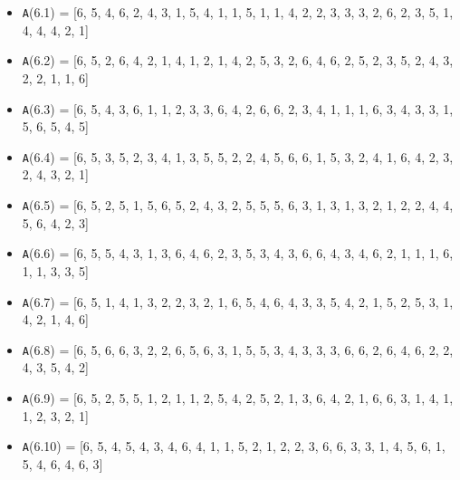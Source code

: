 \documentclass[runningheads, a4paper]{llncs}
\begin{document}
\begin{itemize}
	\item {\texttt A(6.1) = } [6, 5, 4, 6, 2, 4, 3, 1, 5, 4, 1, 1, 5, 1, 1, 4, 2, 2, 3, 3, 3, 2, 6, 2, 3, 5, 1, 4, 4, 4, 2, 1]
	\item {\texttt A(6.2) = } [6, 5, 2, 6, 4, 2, 1, 4, 1, 2, 1, 4, 2, 5, 3, 2, 6, 4, 6, 2, 5, 2, 3, 5, 2, 4, 3, 2, 2, 1, 1, 6]
	\item {\texttt A(6.3) = } [6, 5, 4, 3, 6, 1, 1, 2, 3, 3, 6, 4, 2, 6, 6, 2, 3, 4, 1, 1, 1, 6, 3, 4, 3, 3, 1, 5, 6, 5, 4, 5]
	\item {\texttt A(6.4) = } [6, 5, 3, 5, 2, 3, 4, 1, 3, 5, 5, 2, 2, 4, 5, 6, 6, 1, 5, 3, 2, 4, 1, 6, 4, 2, 3, 2, 4, 3, 2, 1]
	\item {\texttt A(6.5) = } [6, 5, 2, 5, 1, 5, 6, 5, 2, 4, 3, 2, 5, 5, 5, 6, 3, 1, 3, 1, 3, 2, 1, 2, 2, 4, 4, 5, 6, 4, 2, 3]
	
	\item {\texttt A(6.6) = } [6, 5, 5, 4, 3, 1, 3, 6, 4, 6, 2, 3, 5, 3, 4, 3, 6, 6, 4, 3, 4, 6, 2, 1, 1, 1, 6, 1, 1, 3, 3, 5]
	\item {\texttt A(6.7) = } [6, 5, 1, 4, 1, 3, 2, 2, 3, 2, 1, 6, 5, 4, 6, 4, 3, 3, 5, 4, 2, 1, 5, 2, 5, 3, 1, 4, 2, 1, 4, 6]
	\item {\texttt A(6.8) = } [6, 5, 6, 6, 3, 2, 2, 6, 5, 6, 3, 1, 5, 5, 3, 4, 3, 3, 3, 6, 6, 2, 6, 4, 6, 2, 2, 4, 3, 5, 4, 2]
	\item {\texttt A(6.9) = } [6, 5, 2, 5, 5, 1, 2, 1, 1, 2, 5, 4, 2, 5, 2, 1, 3, 6, 4, 2, 1, 6, 6, 3, 1, 4, 1, 1, 2, 3, 2, 1]
	\item {\texttt A(6.10) = } [6, 5, 4, 5, 4, 3, 4, 6, 4, 1, 1, 5, 2, 1, 2, 2, 3, 6, 6, 3, 3, 1, 4, 5, 6, 1, 5, 4, 6, 4, 6, 3]	

\end{itemize}
\end{document}
